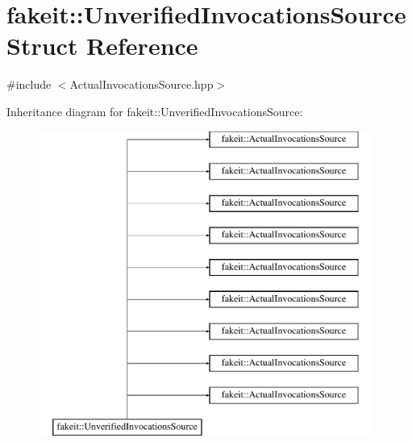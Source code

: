 \hypertarget{structfakeit_1_1UnverifiedInvocationsSource}{}\section{fakeit\+::Unverified\+Invocations\+Source Struct Reference}
\label{structfakeit_1_1UnverifiedInvocationsSource}


{\ttfamily \#include $<$Actual\+Invocations\+Source.\+hpp$>$}

Inheritance diagram for fakeit\+::Unverified\+Invocations\+Source\+:\begin{figure}[H]
\begin{center}
\leavevmode
\includegraphics[height=10.000000cm]{structfakeit_1_1UnverifiedInvocationsSource}
\end{center}
\end{figure}
